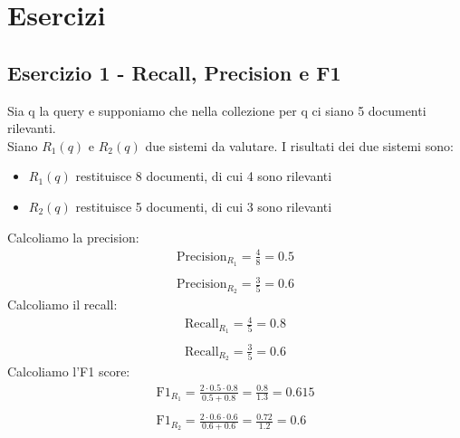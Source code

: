 \documentclass{report}
\begin{document}
	\newpage
	\section{Esercizi}
	\subsection*{Esercizio 1 - Recall, Precision e F1}
	Sia q la query e supponiamo che nella collezione per q ci siano 5 documenti rilevanti.
	\vspace{\baselineskip}\\
	Siano $R_{1}(q)$ e $R_{2}(q)$ due sistemi da valutare. I risultati dei due sistemi sono:
	\begin{itemize}
		\item $R_{1}(q)$ restituisce 8 documenti, di cui 4 sono rilevanti
		\item $R_{2}(q)$ restituisce 5 documenti, di cui 3 sono rilevanti 
	\end{itemize}
	Calcoliamo la precision:
	\[
		\begin{array}{l}
			\text{Precision}_{R_{1}} = \frac{4}{8} = 0.5\\\\
			\text{Precision}_{R_{2}} = \frac{3}{5} = 0.6
		\end{array}
	\]
	Calcoliamo il recall:
	\[
		\begin{array}{l}
			\text{Recall}_{R_{1}} = \frac{4}{5} = 0.8\\\\
			\text{Recall}_{R_{2}} = \frac{3}{5} = 0.6
		\end{array}
	\]
	Calcoliamo l'F1 score:
	\[
		\begin{array}{l}
			\text{F1}_{R_{1}} = \frac{2 \cdot 0.5 \cdot 0.8}{0.5 + 0.8} = \frac{0.8}{1.3} = 0.615\\\\
			\text{F1}_{R_{2}} = \frac{2 \cdot 0.6 \cdot 0.6}{0.6 + 0.6} = \frac{0.72}{1.2} = 0.6
		\end{array}
	\]
\end{document}
